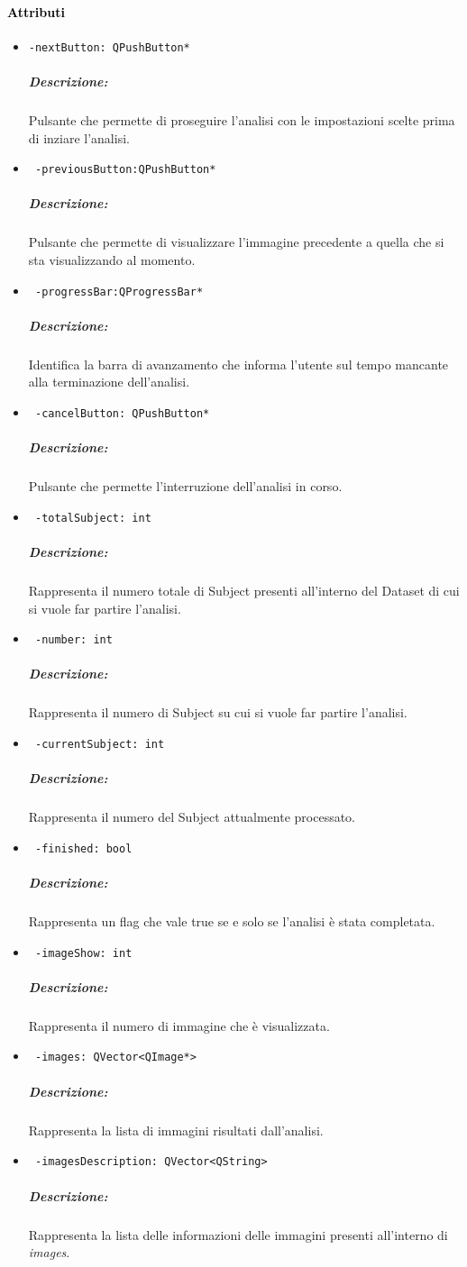 \paragraph{\textcolor{black}{Attributi\\}}
\begin{itemize}
\item \color{teal}\verb!-nextButton: QPushButton*!
\color{black}
\subparagraph{Descrizione:} Pulsante che permette di proseguire l'analisi con le impostazioni scelte prima di inziare l'analisi.

\item \color{teal}\verb! -previousButton:QPushButton*!
\color{black} 
\subparagraph{Descrizione:} Pulsante che permette di visualizzare l'immagine precedente a quella che si sta visualizzando al momento.

\item \color{teal}\verb! -progressBar:QProgressBar*!
\color{black} 
\subparagraph{Descrizione: }Identifica la barra di avanzamento che informa l'utente sul tempo mancante alla terminazione dell'analisi.

\item \color{teal}\verb! -cancelButton: QPushButton*!
\color{black}
\subparagraph{Descrizione:} Pulsante che permette l'interruzione dell'analisi in corso.

\item \color{teal}\verb! -totalSubject: int!
\color{black}
\subparagraph{Descrizione:} Rappresenta il numero totale di Subject\g{} presenti all'interno del Dataset\g{} di cui si vuole far partire l'analisi.

\item \color{teal}\verb! -number: int!
\color{black}
\subparagraph{Descrizione:} Rappresenta il numero di Subject\g{} su cui si vuole far partire l'analisi.

\item \color{teal}\verb! -currentSubject: int!
\color{black}
\subparagraph{Descrizione:} Rappresenta il numero del Subject\g{} attualmente processato.

\item \color{teal}\verb! -finished: bool!
\color{black}
\subparagraph{Descrizione:} Rappresenta un flag che vale true se e solo se l'analisi è stata completata.

\item \color{teal}\verb! -imageShow: int!
\color{black}
\subparagraph{Descrizione:} Rappresenta il numero di immagine che è visualizzata.

\item \color{teal}\verb! -images: QVector<QImage*>!
\color{black}
\subparagraph{Descrizione:} Rappresenta la lista di immagini risultati dall'analisi.

\item \color{teal}\verb! -imagesDescription: QVector<QString>!
\color{black}
\subparagraph{Descrizione:} Rappresenta la lista delle informazioni delle immagini presenti all'interno di \textit{images}.
\end{itemize}

